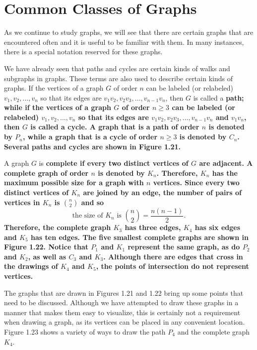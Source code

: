 \section{Common Classes of Graphs}
As we continue to study graphs, we will see that there are certain graphs that are encountered often and it is useful to be familiar with them. In many instances, there is a special notation reserved for these graphs.

We have already seen that paths and cycles are certain kinds of walks and subgraphs in graphs. These terms are also used to describe certain kinds of graphs. If the vertices of a graph $G$ of order $n$ can be labeled (or relabeled) $v_{1},v_{2},\ldots,v_{n}$ so that its edges are $v_{1}v_{2},v_{2}v_{3},\ldots,v_{n-1}v_{n}$, then $G$ is called a \bf{path}; while if the vertices of a graph $G$ of order $n \geq 3$ can be labeled (or relabeled) $v_{1},v_{2},\ldots,v_{n}$ so that its edges are $v_{1}v_{2},v_{2}v_{3},\ldots,v_{n-1}v_{n}$ and $v_{1}v_{n}$, then $G$ is called a \bf{cycle}. A graph that is a path of order $n$ is denoted by $P_{n}$, while a graph that is a cycle of order $n \geq 3$ is denoted by $C_{n}$. Several paths and cycles are shown in Figure 1.21.



A graph $G$ is \bf{complete} if every two distinct vertices of $G$ are adjacent. A complete graph of order $n$ is denoted by $K_{n}$. Therefore, $K_{n}$ has the maximum possible size for a graph with $n$ vertices. Since every two distinct vertices of $K_{n}$ are joined by an edge, the number of pairs of vertices in $K_{n}$ is $n \choose 2$ and so
\begin{equation}
\text{the size of $K_{n}$ is $n \choose 2$} = \frac{n(n-1)}{2}.
\end{equation}
Therefore, the complete graph $K_{3}$ has three edges, $K_{4}$ has six edges and $K_{5}$ has ten edges. The five smallest complete graphs are shown in Figure 1.22. Notice that $P_{1}$ and $K_{1}$ represent the same graph, as do $P_{2}$ and $K_{2}$, as well as $C_{3}$ and $K_{3}$. Although there are edges that cross in the drawings of $K_{4}$ and $K_{5}$, the points of intersection do not represent vertices.



The graphs that are drawn in Figures 1.21 and 1.22 bring up some points that need to be discussed. Although we have attempted to draw these graphs in a manner that makes them easy to visualize, this is certainly not a requirement when drawing a graph, as its vertices can be placed in any convenient location. Figure 1.23 shows a variety of ways to draw the path $P_{4}$ and the complete graph $K_{4}$.


